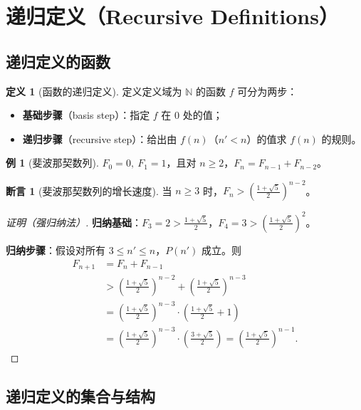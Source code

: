 \documentclass[UTF8,11pt,a4paper]{ctexbook}   %
\theoremstyle{definition}
\newtheorem{definition}{定义}[section]
\newtheorem{example}{例}[section]
\newtheorem{proposition}{断言}[section]
\begin{document}
\section{递归定义（Recursive Definitions）}

\subsection{递归定义的函数}

\begin{definition}[函数的递归定义]
定义定义域为 $\mathbb{N}$ 的函数 $f$ 可分为两步：
\begin{itemize}
    \item \textbf{基础步骤}（basis step）：指定 $f$ 在 $0$ 处的值；
    \item \textbf{递归步骤}（recursive step）：给出由 $f(n)$（$n' < n$）的值求 $f(n)$ 的规则。
\end{itemize}
\end{definition}

\begin{example}[斐波那契数列]
$F_0 = 0,\ F_1 = 1$，且对 $n \geq 2$，$F_n = F_{n-1} + F_{n-2}$。
\end{example}

\begin{proposition}[斐波那契数列的增长速度]
当 $n \geq 3$ 时，$F_n > \left(\frac{1+\sqrt{5}}{2}\right)^{n-2}$。
\end{proposition}

\begin{proof}[证明（强归纳法）]
\textbf{归纳基础}：$F_3=2 > \frac{1+\sqrt{5}}{2}$，$F_4=3 > \left(\frac{1+\sqrt{5}}{2}\right)^2$。

\textbf{归纳步骤}：假设对所有 $3 \leq n' \leq n$，$P(n')$ 成立。则
\begin{align*}
F_{n+1} &= F_n + F_{n-1} \\
&> \left(\frac{1+\sqrt{5}}{2}\right)^{n-2} + \left(\frac{1+\sqrt{5}}{2}\right)^{n-3} \\
&= \left(\frac{1+\sqrt{5}}{2}\right)^{n-3} \cdot \left(\frac{1+\sqrt{5}}{2} + 1\right) \\
&= \left(\frac{1+\sqrt{5}}{2}\right)^{n-3} \cdot \left(\frac{3+\sqrt{5}}{2}\right) = \left(\frac{1+\sqrt{5}}{2}\right)^{n-1}.
\end{align*}
\end{proof}

\subsection{递归定义的集合与结构}
\end{document}
